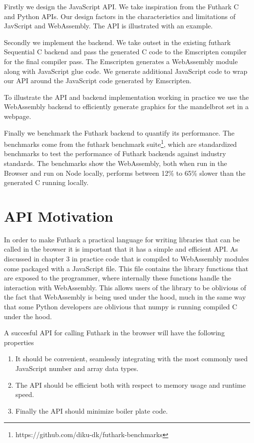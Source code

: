 \documentclass[11pt]{book}
\begin{document}
Firstly we design the JavaScript API. We take inspiration from the Futhark C and Python APIs. Our design factors in the characteristics and limitations of JavScript and WebAssembly. The API is illustrated with an example.



Secondly we implement the backend. We take outset in the existing futhark Sequential C backend and pass the generated C code to the Emscripten compiler for the final compiler pass. The Emscripten generates a WebAssembly module along with JavaScript glue code. We generate additional JavaScript code to wrap our API around the JavaScript code generated by Emscripten.

To illustrate the API and backend implementation working in practice we use the WebAssembly backend to efficiently generate graphics for the mandelbrot set in a webpage.

Finally we benchmark the Futhark backend to quantify its performance. The benchmarks come from the futhark benchmark suite\footnote{https://github.com/diku-dk/futhark-benchmarks}, which are standardized benchmarks to test the performance of Futhark backends against industry standards. The benchmarks show the WebAssembly, both when run in the Browser and run on Node locally, performs between 12\% to 65\% slower than the generated C running locally. 

\section{API Motivation}

In order to make Futhark a practical language for writing libraries that can be called in the browser it is important that it has a simple and efficient API. As discussed in chapter 3 in practice code that is compiled to WebAssembly modules come packaged with a JavaScript file. This file contains the library functions that are exposed to the programmer, where internally these functions handle the interaction with WebAssembly. This allows users of the library to be oblivious of the fact that WebAssembly is being used under the hood, much in the same way that some Python developers are oblivious that numpy is running compiled C under the hood.

A succesful API for calling Futhark in the browser will have the following properties
\begin{enumerate}
    \item It should be convenient, seamlessly integrating with the most commonly used JavaScript number and array data types.
    \item The API should be efficient both with respect to memory usage and runtime speed.
    \item Finally the API should minimize boiler plate code.
\end{enumerate}
\end{document}
